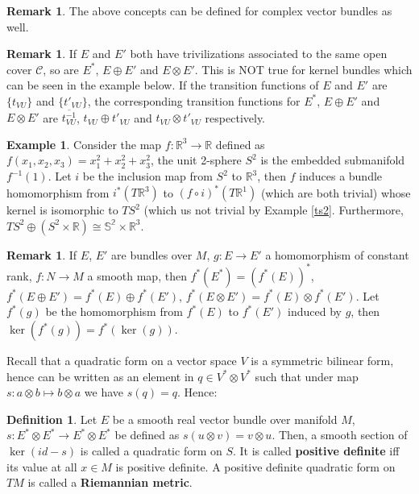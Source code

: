 \documentclass{article}
\theoremstyle{definition}
\newtheorem{dfn}[thm]{Definition}
\newtheorem{rmk}[thm]{Remark}
\newtheorem{exm}[thm]{Example}
\begin{document}
\begin{rmk}
    The above concepts can be defined for complex vector bundles as well.
\end{rmk}

\begin{rmk}
    If $E$ and $E'$ both have trivilizations associated to the same open cover $\mathcal{C}$, so are $E^*$, $E\oplus E'$ and $E\otimes E'$. This is NOT true for kernel bundles which can be seen in the example below. If the transition functions of $E$ and $E'$ are $\{t_{VU}\}$ and $\{t'_{VU}\}$, the corresponding transition functions for $E^*$, $E\oplus E'$ and $E\otimes E'$ are $\overline{t_{VU}^{-1}}$, $t_{VU}\oplus t'_{VU}$ and $t_{VU}\otimes t'_{VU}$ respectively.
\end{rmk}

\begin{exm}
    Consider the map $f: \mathbb{R}^3\rightarrow\mathbb{R}$ defined as $f(x_1, x_2, x_3)=x_1^2+x_2^2+x_3^2$, the unit 2-sphere $S^2$ is the embedded submanifold $f^{-1}(1)$. Let $i$ be the inclusion map from $S^2$ to $\mathbb{R}^3$, then $f$ induces a bundle homomorphism from $i^*(T\mathbb{R}^3)$ to $(f\circ i)^*(T\mathbb{R}^1)$ (which are both trivial) whose kernel is isomorphic to $TS^2$ (which us not trivial by Example \ref{ts2}. Furthermore, $TS^2\oplus (S^2\times \mathbb{R})\cong \mathbb{S^2}\times\mathbb{R}^3$.
\end{exm}

\begin{rmk}
    If $E$, $E'$ are bundles over $M$, $g: E\rightarrow E'$ a homomorphism of constant rank, $f: N\rightarrow M$ a smooth map, then $f^*(E^*)=(f^*(E))^*$, $f^*(E\oplus E')=f^*(E)\oplus f^*(E')$, $f^*(E\otimes E')=f^*(E)\otimes f^*(E')$. Let $f^*(g)$ be the homomorphism from $f^*(E)$ to $f^*(E')$ induced by $g$, then $\ker(f^*(g))=f^*(\ker(g))$.
\end{rmk}

Recall that a quadratic form on a vector space $V$ is a symmetric bilinear form, hence can be written as an element in $q\in V^*\otimes V^*$ such that under map $s: a\otimes b\mapsto b\otimes a$ we have $s(q)=q$. Hence:

\begin{dfn}
    Let $E$ be a smooth real vector bundle over manifold $M$, $s: E^*\otimes E^*\rightarrow E^*\otimes E^*$ be defined as $s(u\otimes v)=v\otimes u$. Then, a smooth section of $\ker(id-s)$ is called a quadratic form on $S$. It is called {\bf positive definite} iff its value at all $x\in M$ is positive definite. A positive definite quadratic form on $TM$ is called a {\bf Riemannian metric}.
\end{dfn}
\end{document}
